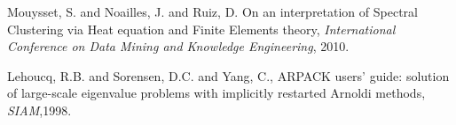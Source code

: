 \documentclass{llncs}
\begin{document}
\begin{thebibliography}{5}
Mouysset, S. and Noailles, J. and Ruiz, D.
On an interpretation of Spectral Clustering via Heat equation and Finite Elements theory,
\emph{International Conference on Data Mining and Knowledge Engineering}, 2010.



Lehoucq, R.B. and Sorensen, D.C. and Yang, C.,
 ARPACK users' guide: solution of large-scale eigenvalue problems with implicitly restarted Arnoldi methods,
\emph{SIAM},1998. 





%
\end{thebibliography}
\end{document}
